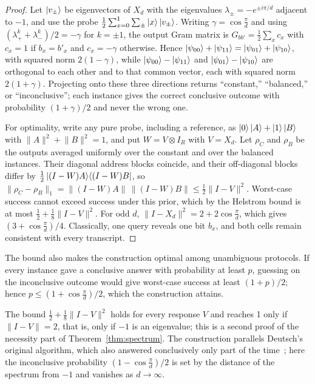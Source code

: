 \documentclass[
  aps,
  pra,
  reprint,
  nofootinbib
]{revtex4-2}
\begin{document}
\begin{proof}
Let \(\ket{v_\pm}\) be eigenvectors of \(X_d\) with the eigenvalues
\(\lambda_\pm=-e^{\pm i\pi/d}\) adjacent to \(-1\), and use the probe
\(\frac12\sum_{x=0}^1\sum_\pm\ket x\ket{v_\pm}\). Writing
\(\gamma=\cos\frac{\pi}{d}\) and using
\((\lambda_+^{k}+\lambda_-^{k})/2=-\gamma\) for \(k=\pm1\), the output Gram
matrix is \(G_{bb'}=\frac12\sum_x c_x\) with \(c_x=1\) if \(b_x=b'_x\) and
\(c_x=-\gamma\) otherwise. Hence
\(\ket{\psi_{00}}+\ket{\psi_{11}}=\ket{\psi_{01}}+\ket{\psi_{10}}\), with squared
norm \(2(1-\gamma)\), while \(\ket{\psi_{00}}-\ket{\psi_{11}}\) and
\(\ket{\psi_{01}}-\ket{\psi_{10}}\) are orthogonal to each other and to that
common vector, each with squared norm \(2(1+\gamma)\). Projecting onto these
three directions returns ``constant,'' ``balanced,'' or ``inconclusive''; each
instance gives the correct conclusive outcome with probability
\((1+\gamma)/2\) and never the wrong one.

For optimality, write any pure probe, including a reference, as
\(\ket0\ket A+\ket1\ket B\) with \(\lVert A\rVert^2+\lVert B\rVert^2=1\), and
put \(W=V\otimes I_R\) with \(V=X_d\). Let \(\rho_C\) and \(\rho_B\) be the
outputs averaged uniformly over the constant and over the balanced instances.
Their diagonal address blocks coincide, and their off-diagonal blocks differ
by \(\frac12\ket{(I-W)A}\!\bra{(I-W)B}\), so
\(\lVert\rho_C-\rho_B\rVert_1=\lVert(I-W)A\rVert\,\lVert(I-W)B\rVert
\le\frac12\lVert I-V\rVert^2\). Worst-case success cannot exceed success under
this prior, which by the Helstrom bound is at most
\(\frac12+\frac18\lVert I-V\rVert^2\). For odd \(d\),
\(\lVert I-X_d\rVert^2=2+2\cos\frac{\pi}{d}\), which gives
\((3+\cos\frac{\pi}{d})/4\). Classically, one query reveals one bit \(b_x\),
and both cells remain consistent with every transcript.
\end{proof}

The bound also makes the construction optimal among unambiguous protocols. If
every instance gave a conclusive answer with probability at least \(p\),
guessing on the inconclusive outcome would give worst-case success at least
\((1+p)/2\); hence \(p\le(1+\cos\frac{\pi}{d})/2\), which the construction
attains.

The bound \(\frac12+\frac18\lVert I-V\rVert^2\) holds for every response \(V\)
and reaches 1 only if \(\lVert I-V\rVert=2\), that is, only if \(-1\) is an
eigenvalue; this is a second proof of the necessity part of
Theorem~\ref{thm:spectrum}. The construction parallels
Deutsch's original algorithm, which also answered conclusively only part of
the time~\cite{deutsch}; here the inconclusive probability
\((1-\cos\frac{\pi}{d})/2\) is set by the distance of the spectrum from \(-1\)
and vanishes as \(d\to\infty\).
\end{document}
